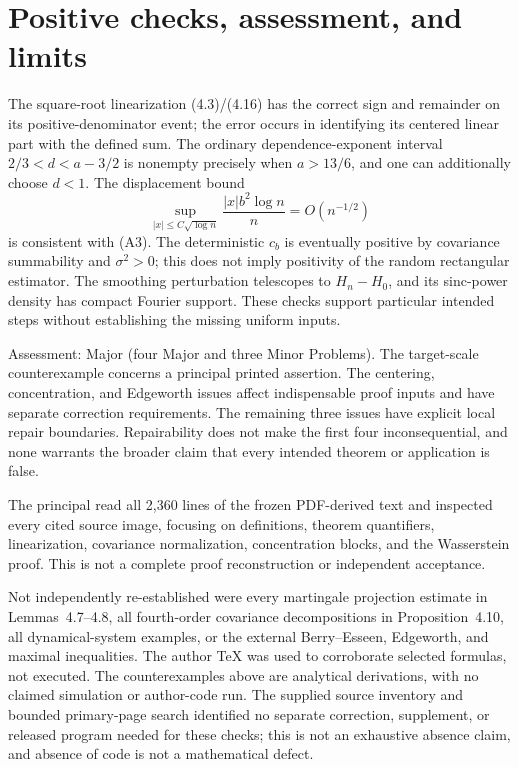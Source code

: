 \documentclass[10pt]{article}
\begin{document}
\section*{Positive checks, assessment, and limits}
The square-root linearization (4.3)/(4.16) has the correct sign and remainder on its positive-denominator event; the error occurs in identifying its centered linear part with the defined sum. The ordinary dependence-exponent interval \(2/3<d<a-3/2\) is nonempty precisely when \(a>13/6\), and one can additionally choose \(d<1\). The displacement bound \[\sup_{|x|\le C\sqrt{\log n}}\frac{|x|b^2\log n}{n}
=O(n^{-1/2})\] is consistent with (A3). The deterministic \(c_b\) is eventually positive by covariance summability and \(\sigma^2>0\); this does not imply positivity of the random rectangular estimator. The smoothing perturbation telescopes to \(H_n-H_0\), and its sinc-power density has compact Fourier support. These checks support particular intended steps without establishing the missing uniform inputs.\par
Assessment: Major (four Major and three Minor Problems). The target-scale counterexample concerns a principal printed assertion. The centering, concentration, and Edgeworth issues affect indispensable proof inputs and have separate correction requirements. The remaining three issues have explicit local repair boundaries. Repairability does not make the first four inconsequential, and none warrants the broader claim that every intended theorem or application is false.\par
The principal read all 2,360 lines of the frozen PDF-derived text and inspected every cited source image, focusing on definitions, theorem quantifiers, linearization, covariance normalization, concentration blocks, and the Wasserstein proof. This is not a complete proof reconstruction or independent acceptance.\par
Not independently re-established were every martingale projection estimate in Lemmas 4.7–4.8, all fourth-order covariance decompositions in Proposition 4.10, all dynamical-system examples, or the external Berry–Esseen, Edgeworth, and maximal inequalities. The author TeX was used to corroborate selected formulas, not executed. The counterexamples above are analytical derivations, with no claimed simulation or author-code run. The supplied source inventory and bounded primary-page search identified no separate correction, supplement, or released program needed for these checks; this is not an exhaustive absence claim, and absence of code is not a mathematical defect.\par
\end{document}
